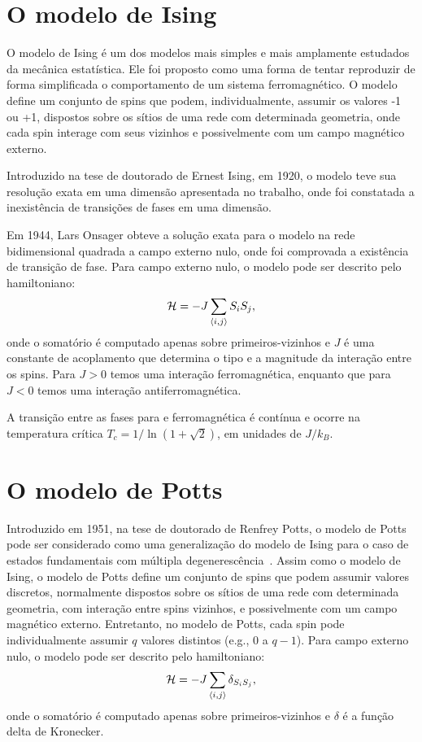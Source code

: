 \section{O modelo de Ising}

O modelo de Ising é um dos modelos mais simples e mais amplamente estudados da mecânica estatística. Ele foi proposto como uma forma de tentar reproduzir de forma simplificada o comportamento de um sistema ferromagnético. O modelo define um conjunto de spins que podem, individualmente, assumir os valores -1 ou +1, dispostos sobre os sítios de uma rede com determinada geometria, onde cada spin interage com seus vizinhos e possivelmente com um campo magnético externo.

Introduzido na tese de doutorado de Ernest Ising, em 1920, o modelo teve sua resolução exata em uma dimensão apresentada no trabalho, onde foi constatada a inexistência de transições de fases em uma dimensão.

Em 1944, Lars Onsager \cite{Onsager} obteve a solução exata para o modelo na rede bidimensional quadrada a campo externo nulo, onde foi comprovada a existência de transição de fase. Para campo externo nulo, o modelo pode ser descrito pelo hamiltoniano:
\begin{equation}
  {\cal H} = -J \sum_{\langle i,j \rangle} S_i S_j,
\end{equation}
onde o somatório é computado apenas sobre primeiros-vizinhos e $J$ é uma constante de acoplamento que determina o tipo e a magnitude da interação entre os spins. Para $J>0$ temos uma interação ferromagnética, enquanto que para $J<0$ temos uma interação antiferromagnética.

A transição entre as fases para e ferromagnética é contínua e ocorre na temperatura crítica $T_c = 1/\ln(1+\sqrt{2})$, em unidades de $J/k_B$.


\section{O modelo de Potts}

Introduzido em 1951, na tese de doutorado de Renfrey Potts, o modelo de Potts pode ser considerado como uma generalização do modelo de Ising para o caso de estados fundamentais com múltipla degenerescência~\cite{Wu}. Assim como o modelo de Ising, o modelo de Potts define um conjunto de spins que podem assumir valores discretos, normalmente dispostos sobre os sítios de uma rede com determinada geometria, com interação entre spins vizinhos, e possivelmente com um campo magnético externo. Entretanto, no modelo de Potts, cada spin pode individualmente assumir $q$ valores distintos (e.g., $0$ a $q-1$). Para campo externo nulo, o modelo pode ser descrito pelo hamiltoniano:
\begin{equation}
 {\cal H} = -J \sum_{\langle i,j \rangle} \delta_{S_i S_j},
\end{equation} 
onde o somatório é computado apenas sobre primeiros-vizinhos e $\delta$ é a função delta de Kronecker.

